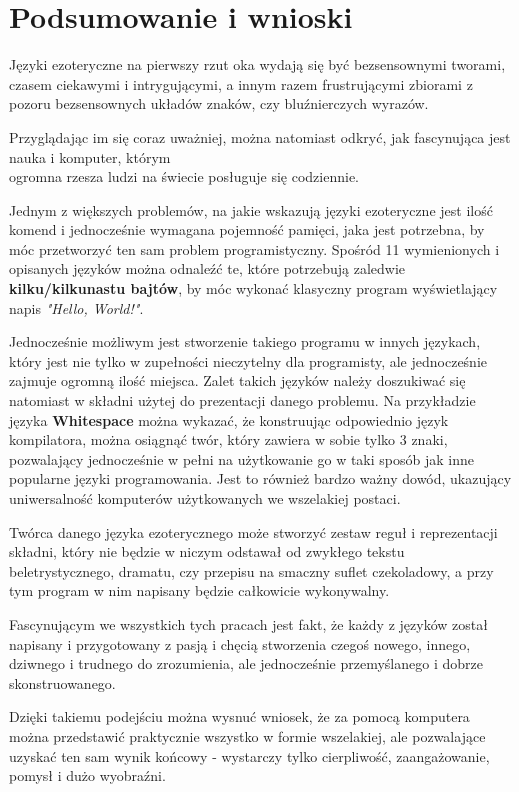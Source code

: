 \documentclass[fleqn,10pt]{SelfArx} %
\begin{document}
\section{Podsumowanie i wnioski}
\par Języki ezoteryczne na pierwszy rzut oka wydają się być bezsensownymi tworami, czasem ciekawymi i intrygującymi, a innym razem frustrującymi zbiorami z pozoru bezsensownych układów znaków, czy bluźnierczych wyrazów.
\par Przyglądając im się coraz uważniej, można natomiast odkryć, jak fascynująca jest nauka i komputer, którym\\ogromna rzesza ludzi na świecie posługuje się codziennie. 
\par Jednym z większych problemów, na jakie wskazują języki ezoteryczne jest ilość komend i jednocześnie wymagana pojemność pamięci, jaka jest potrzebna, by móc przetworzyć ten sam problem programistyczny. Spośród 11 wymienionych i opisanych języków można odnaleźć te, które potrzebują zaledwie \textbf{kilku/kilkunastu bajtów}, by móc wykonać klasyczny program wyświetlający napis \textit{"Hello, World!"}. 
\par Jednocześnie możliwym jest stworzenie takiego programu w innych językach, który jest nie tylko w zupełności nieczytelny dla programisty, ale jednocześnie zajmuje ogromną ilość miejsca. Zalet takich języków należy doszukiwać się natomiast w składni użytej do prezentacji danego problemu. Na przykładzie języka \textbf{Whitespace} można wykazać, że konstruując odpowiednio język kompilatora, można osiągnąć twór, który zawiera w sobie tylko 3 znaki, pozwalający jednocześnie w pełni na użytkowanie go w taki sposób jak inne popularne języki programowania. Jest to również bardzo ważny dowód, ukazujący uniwersalność komputerów użytkowanych we wszelakiej postaci. \par Twórca danego języka ezoterycznego może stworzyć zestaw reguł i reprezentacji składni, który nie będzie w niczym odstawał od zwykłego tekstu beletrystycznego, dramatu, czy przepisu na smaczny suflet czekoladowy, a przy tym program w nim napisany będzie całkowicie wykonywalny.
\par Fascynującym we wszystkich tych pracach jest fakt, że każdy z języków został napisany i przygotowany z pasją i chęcią stworzenia czegoś nowego, innego, dziwnego i trudnego do zrozumienia, ale jednocześnie przemyślanego i dobrze skonstruowanego. 
\par Dzięki takiemu podejściu można wysnuć wniosek, że za pomocą komputera można przedstawić praktycznie wszystko w formie wszelakiej, ale pozwalające uzyskać ten sam wynik końcowy - wystarczy tylko cierpliwość, zaangażowanie, pomysł i dużo wyobraźni.



\end{document}
